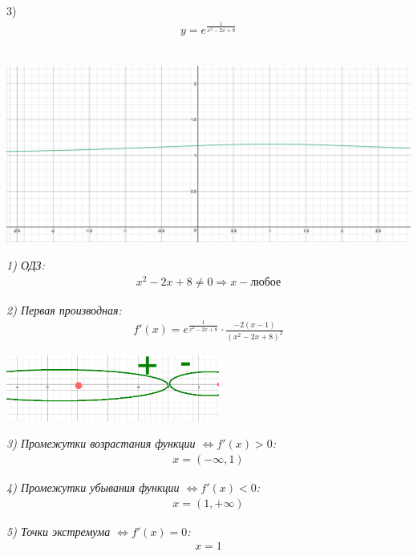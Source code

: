 \documentclass[a4paper,11pt]{article}
\begin{document}




3)
\begin{align*}
y = e^{\frac{1}{x^2 - 2x + 8}}
\end{align*} \\
\begin{center}
	\includegraphics[width = 150mm]{images/731.png}
\end{center}

\noindent \textsl{1) ОДЗ:}
\begin{gather*}
x^2 - 2x + 8 \neq 0 \Rightarrow x - \textit{любое}
\end{gather*}

\noindent  \textsl{2) Первая производная:}
\begin{gather*}
f'(x) =  e^{\frac{1}{x^2 - 2x + 8}} \cdot \frac{-2(x - 1)}{(x^2 - 2x + 8)^2}
\end{gather*} 
\begin{center}
	\includegraphics[width = 70mm]{images/732.png}
\end{center}

\noindent \textsl{3) Промежутки возрастания функции   $\Longleftrightarrow f'(x) > 0 $:}
\begin{gather*}
x = (-\infty, 1)
\end{gather*}

\noindent \textsl{4) Промежутки убывания функции   $\Longleftrightarrow f'(x) < 0 $:}
\begin{gather*}
x = (1, +\infty)
\end{gather*}

\noindent \textsl{5) Точки экстремума   $\Longleftrightarrow f'(x) = 0 $:}
\begin{align*}
x = 1
\end{align*}
\end{document}
